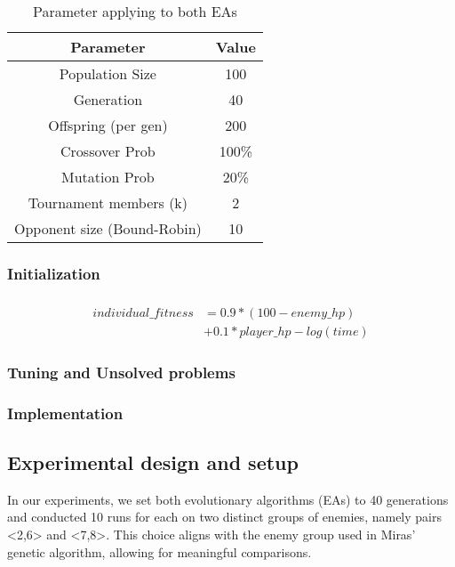 \begin{table}
    \centering
    \caption{Parameter applying to both EAs}
    \label{tab:my_label}
    \begin{tabular}{@{}cc@{}}
     \hline %
        Parameter & Value \\ \hline
        Population Size & 100 \\
        Generation & 40 \\
        Offspring (per gen) & 200 \\
        Crossover Prob & 100\% \\
        Mutation Prob & 20\%  \\
        Tournament members (k) & 2 \\
        Opponent size (Bound-Robin) & 10 \\ \hline
    \end{tabular}
\end{table}

\subsubsection{Initialization}


\subsubsection{}
\begin{align*}
    individual\_fitness & = 0.9 * (100 - enemy\_hp)
    \\ &+ 0.1* player\_hp - log (time)
\end{align*}

\subsubsection{Tuning and Unsolved problems}
\label{sec:improve}

\subsubsection{Implementation}


\subsection{Experimental design and setup}
In our experiments, we set both evolutionary algorithms (EAs) to 40 generations and conducted 10 runs for each on two distinct groups of enemies, namely pairs <2,6> and <7,8>. This choice aligns with the enemy group used in Miras' genetic algorithm, allowing for meaningful comparisons.

